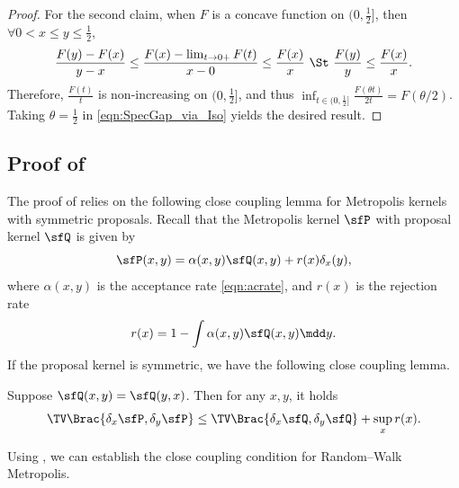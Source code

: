 \documentclass[11pt]{article}
\begin{document}
\begin{proof}
For the second claim, when $F$ is a concave function on $(0,\frac{1}{2}]$, then $\forall 0<x\le y\le \frac{1}{2}$,
\[
    \frac{F(y)-F(x)}{y-x} \le \frac{F(x) - \lim_{t \to 0+} F(t) }{x - 0} \le \frac{F(x)}{x} ~\St~ \frac{F(y)}{y} \le \frac{F(x)}{x}.
\]
Therefore, $\frac{F(t)}{t}$ is non-increasing on $(0,\frac{1}{2}]$, and thus $\inf_{t\in(0,\frac{1}{2}]} \frac{ F(\theta t) }{ 2t } = F(\theta/2)$.
Taking $\theta = \frac{1}{2}$ in \eqref{eqn:SpecGap_via_Iso} yields the desired result.
\end{proof}



\subsection{Proof of \texorpdfstring{}{Lemma \ref{lem:CloseCoupleRWM}}}
\label{app:pf_CloseCoupleRWM}

The proof of  relies on the following close coupling lemma for Metropolis kernels with symmetric proposals.
%
Recall that the Metropolis kernel $\sfP$ with proposal kernel $\sfQ$ is given by
\[
    \sfP(x,y) = \alpha(x,y) \sfQ(x,y)
    + r(x) \delta_x(y),
\]
where $\alpha(x,y)$ is the acceptance rate \eqref{eqn:acrate}, and $r(x)$ is the rejection rate
\begin{equation}
\label{eqn:rejectrate}
    r(x) = 1 - \int \alpha(x,y) \sfQ(x,y) \mdd y.
\end{equation}
If the proposal kernel is symmetric, we have the following close coupling lemma.
%
\begin{lem}
\label{lem:CloseCoupleMH}
Suppose $\sfQ(x,y) = \sfQ(y,x)$. Then for any $x,y$, it holds
\[
    \TV \Brac{ \delta_x \sfP, \delta_y \sfP } \le \TV \Brac{ \delta_x \sfQ, \delta_y \sfQ } + \sup_x r(x).
\]
\end{lem}



Using , we can establish the close coupling condition for Random--Walk Metropolis.
\end{document}
